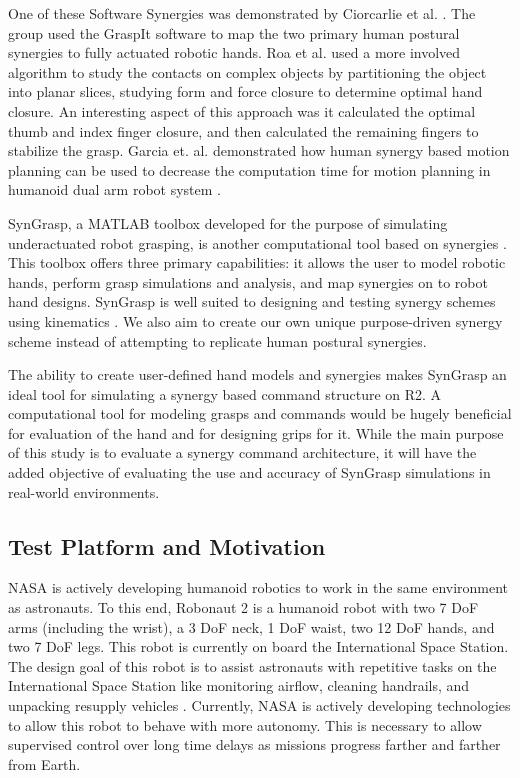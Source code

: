 \documentclass[runningheads,a4paper]{llncs}
\begin{document}
 One of these Software Synergies was demonstrated by Ciorcarlie et al. \cite{ciocarlie_2007_dexterous}.  The group used the GraspIt software to map the two primary human postural synergies to fully actuated robotic hands.  Roa et al. \cite{power_grasp} used a more involved algorithm to study the contacts on complex objects by partitioning the object into planar slices, studying form and force closure  \cite{bicchi} to determine optimal hand closure. An interesting aspect of this approach was it calculated the optimal thumb and index finger closure, and then calculated the remaining fingers to stabilize the grasp.   Garcia et. al. demonstrated how human synergy based motion planning can be used to decrease the computation time for motion planning in humanoid dual arm robot system  \cite{garcia}.

SynGrasp, a MATLAB toolbox developed for the purpose of simulating underactuated robot grasping, is another computational tool based on synergies \cite{syngrasp}.  This toolbox offers three primary capabilities: it allows the user to model robotic hands, perform grasp simulations and analysis, and map synergies on to robot hand designs. SynGrasp is well suited to designing and testing  synergy schemes using kinematics \cite{salvietti_2016_map}.  We also aim to create our own unique purpose-driven synergy scheme instead of attempting to replicate human postural synergies.

The ability to create user-defined hand models and synergies makes SynGrasp an ideal tool for simulating a synergy based command structure on R2.  A computational tool for modeling grasps and commands would be hugely beneficial for evaluation of the hand and for designing grips for it. %
While the main purpose of this study is to evaluate a synergy command architecture, it will have the added objective of evaluating the use and accuracy of SynGrasp simulations in real-world environments.

\subsection{Test Platform and Motivation}

NASA is actively developing humanoid robotics to work in the same environment as astronauts. To this end, Robonaut 2 is a humanoid robot with two 7 DoF arms (including the wrist), a 3 DoF neck, 1 DoF waist, two 12 DoF hands, and two 7 DoF legs. This robot is currently on board the International Space Station. The design goal of this robot is to assist astronauts with repetitive tasks on the International Space Station like monitoring airflow, cleaning handrails, and unpacking resupply vehicles \cite{r2_diftler}. Currently, NASA is actively developing technologies to allow this robot to behave with more autonomy. This is necessary to allow supervised control over long time delays as missions progress farther and farther from Earth. 
\end{document}
